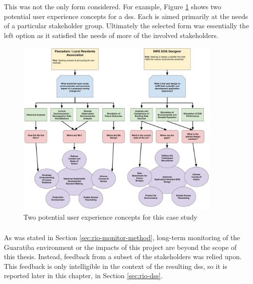 This was not the only form considered. For example, Figure \ref{fig:concept_flow} shows two potential user experience concepts for a \ac{dss}. Each is aimed primarily at the needs of a particular stakeholder group. Ultimately the selected form was essentially the left option as it satisfied the needs of more of the involved stakeholders. 

\begin{figure}[H] 
\centering
\includegraphics[width=0.9\textwidth]{Figures/chap4/concept_flow.jpg}
\caption[Two potential user experience concepts for the Rio de Janeiro case study]{Two potential user experience concepts for this case study}
\label{fig:concept_flow}
\end{figure}

\subsubsection{}

As was stated in Section \ref{sec:rio-monitor-method}, long-term monitoring of the Guaratiba environment or the impacts of this project are beyond the scope of this thesis. Instead, feedback from a subset of the stakeholders was relied upon. This feedback is only intelligible in the context of the resulting \ac{dss}, so it is reported later in this chapter, in Section \ref{sec:rio-dss}.

\section{} \label{sec:rio-evdt}

